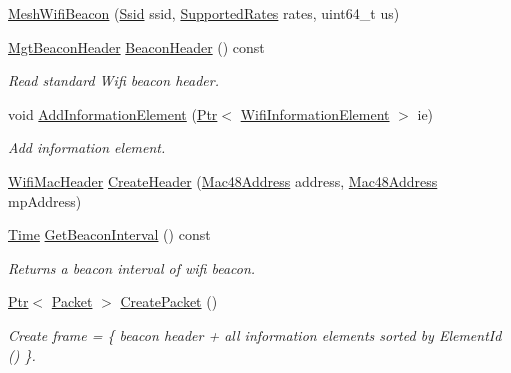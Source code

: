 \begin{DoxyCompactItemize}
\item 
\hyperlink{classns3_1_1MeshWifiBeacon_a7d38b88683a26e46b8330bff3376463b}{Mesh\+Wifi\+Beacon} (\hyperlink{classns3_1_1Ssid}{Ssid} ssid, \hyperlink{classns3_1_1SupportedRates}{Supported\+Rates} rates, uint64\+\_\+t us)
\item 
\hyperlink{classns3_1_1MgtBeaconHeader}{Mgt\+Beacon\+Header} \hyperlink{classns3_1_1MeshWifiBeacon_a4bce8639f57596119f59b01bb3c3ccb0}{Beacon\+Header} () const 
\begin{DoxyCompactList}\small\item\em Read standard Wifi beacon header. \end{DoxyCompactList}\item 
void \hyperlink{classns3_1_1MeshWifiBeacon_adef00c3599e45a9b2d2ec9002a86396b}{Add\+Information\+Element} (\hyperlink{classns3_1_1Ptr}{Ptr}$<$ \hyperlink{classns3_1_1WifiInformationElement}{Wifi\+Information\+Element} $>$ ie)
\begin{DoxyCompactList}\small\item\em Add information element. \end{DoxyCompactList}\item 
\hyperlink{classns3_1_1WifiMacHeader}{Wifi\+Mac\+Header} \hyperlink{classns3_1_1MeshWifiBeacon_a10959c88ec9587162cfebd1332e65a1b}{Create\+Header} (\hyperlink{classns3_1_1Mac48Address}{Mac48\+Address} address, \hyperlink{classns3_1_1Mac48Address}{Mac48\+Address} mp\+Address)
\item 
\hyperlink{classns3_1_1Time}{Time} \hyperlink{classns3_1_1MeshWifiBeacon_aff50d592a87b3d35e3aa5575c807712d}{Get\+Beacon\+Interval} () const 
\begin{DoxyCompactList}\small\item\em Returns a beacon interval of wifi beacon. \end{DoxyCompactList}\item 
\hyperlink{classns3_1_1Ptr}{Ptr}$<$ \hyperlink{classns3_1_1Packet}{Packet} $>$ \hyperlink{classns3_1_1MeshWifiBeacon_a826279378f1756d0f201bae17bbdae90}{Create\+Packet} ()
\begin{DoxyCompactList}\small\item\em Create frame = \{ beacon header + all information elements sorted by Element\+Id () \}. \end{DoxyCompactList}\end{DoxyCompactItemize}
